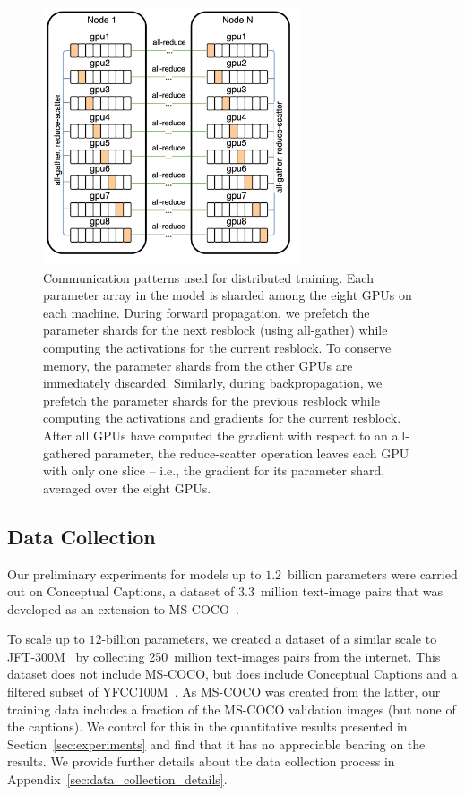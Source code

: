 \documentclass{article}
\begin{document}
\begin{figure}[t]
    \centering
    \includegraphics[width=3in]{dist_comm.png}
    \caption{Communication patterns used for distributed training. Each parameter array in the model is sharded among the eight GPUs on each machine. During forward propagation, we prefetch the parameter shards for the next resblock (using all-gather) while computing the activations for the current resblock. To conserve memory, the parameter shards from the other GPUs are immediately discarded. Similarly, during backpropagation, we prefetch the parameter shards for the previous resblock while computing the activations and gradients for the current resblock. After all GPUs have computed the gradient with respect to an all-gathered parameter, the reduce-scatter operation leaves each GPU with only one slice -- i.e., the gradient for its parameter shard, averaged over the eight GPUs.}
    \label{fig:dist_comm}
\end{figure}

\subsection{Data Collection}
\label{sec:data_collection}

Our preliminary experiments for models up to $1.2$~billion parameters were carried out on Conceptual Captions, a dataset of 3.3~million text-image pairs that was developed as an extension to MS-COCO~\cite{lin2014microsoft}. 

To scale up to $12$-billion parameters, we created a dataset of a similar scale to JFT-300M~\cite{sun2017revisiting} by collecting 250~million text-images pairs from the internet. This dataset does not include MS-COCO, but does include Conceptual Captions and a filtered subset of YFCC100M~\cite{thomee2016yfcc100m}. As MS-COCO was created from the latter, our training data includes a fraction of the MS-COCO validation images (but none of the captions). We control for this in the quantitative results presented in Section~\ref{sec:experiments} and find that it has no appreciable bearing on the results. We provide further details about the data collection process in Appendix~\ref{sec:data_collection_details}.
\end{document}
